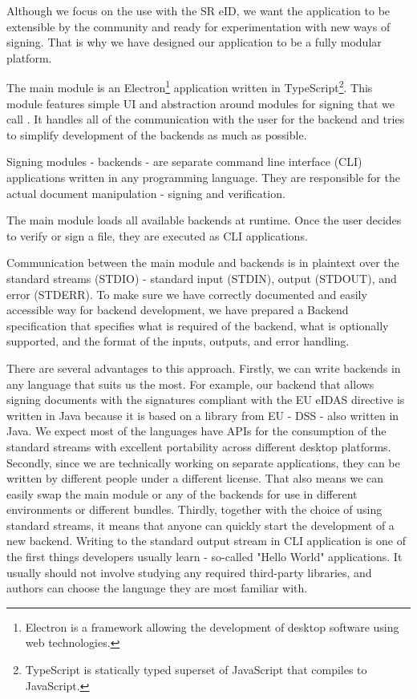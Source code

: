 \documentclass[thesismargins, english, thesislinespacing, onelinechapterstyle, upjsfrontpage]{rnthesis}
\begin{document}
Although we focus on the use with the SR eID, we want the application to be extensible by the community and ready for experimentation with new ways of signing.
That is why we have designed our application to be a fully modular platform.

The main module is an Electron\footnote{Electron is a framework allowing the development of desktop software using web technologies.} application written in TypeScript\footnote{TypeScript is statically typed superset of JavaScript that compiles to JavaScript.}.
This module features simple UI and abstraction around modules for signing that we call .
It handles all of the communication with the user for the backend and tries to simplify development of the backends as much as possible.

Signing modules - backends - are separate command line interface (CLI) applications written in any programming language.
They are responsible for the actual document manipulation - signing and verification.

The main module loads all available backends at runtime.
Once the user decides to verify or sign a file, they are executed as CLI applications.

Communication between the main module and backends is in plaintext over the standard streams (STDIO) - standard input (STDIN), output (STDOUT), and error (STDERR).
To make sure we have correctly documented and easily accessible way for backend development, we have prepared a Backend specification that specifies what is required of the backend, what is optionally supported, and the format of the inputs, outputs, and error handling.


There are several advantages to this approach.
Firstly, we can write backends in any language that suits us the most.
For example, our backend that allows signing documents with the signatures compliant with the EU eIDAS directive is written in Java because it is based on a library from EU - DSS - also written in Java.
We expect most of the languages have APIs for the consumption of the standard streams with excellent portability across different desktop platforms.
Secondly, since we are technically working on separate applications, they can be written by different people under a different license.
That also means we can easily swap the main module or any of the backends for use in different environments or different bundles.
Thirdly, together with the choice of using standard streams, it means that anyone can quickly start the development of a new backend.
Writing to the standard output stream in CLI application is one of the first things developers usually learn - so-called "Hello World" applications.
It usually should not involve studying any required third-party libraries, and authors can choose the language they are most familiar with.
\end{document}
